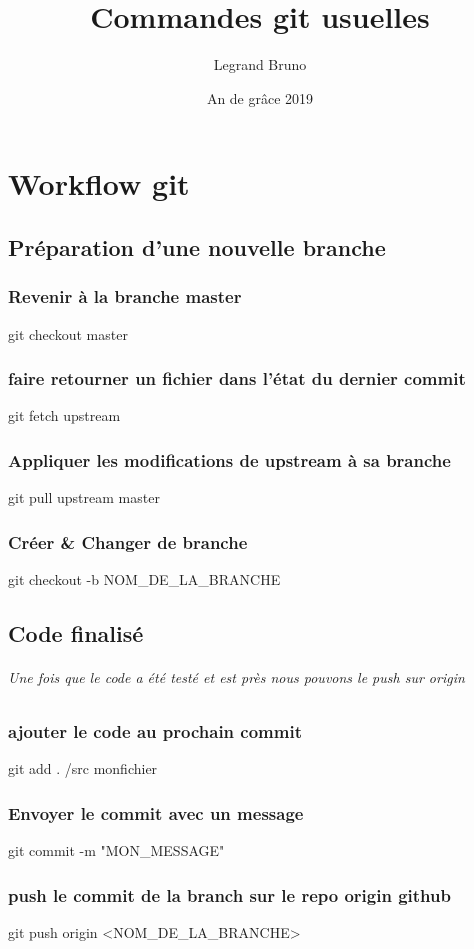 \documentclass{report}
\title{Commandes git usuelles}
\author{Legrand Bruno}
\date{An de grâce 2019}
\begin{document}
\maketitle

\part{Workflow git}
\chapter{Préparation d'une nouvelle branche}
\section{Revenir à la branche master}
git checkout master

\section{faire retourner un fichier dans l'état du dernier commit}
git fetch upstream

\section{Appliquer les modifications de upstream à sa branche}
git pull upstream master

\section{Créer \& Changer de branche}
git checkout -b \og NOM\_DE\_LA\_BRANCHE \fg


\chapter{Code finalisé}
\paragraph{Une fois que le code a été testé et est près nous pouvons le push sur origin}

\section{ajouter le code au prochain commit}
git add \og . /src monfichier \fg

\section{Envoyer le commit avec un message}
git commit -m "MON\_MESSAGE"

\section{push le commit de la branch sur le repo origin github}
git push origin <NOM\_DE\_LA\_BRANCHE>
\end{document}

